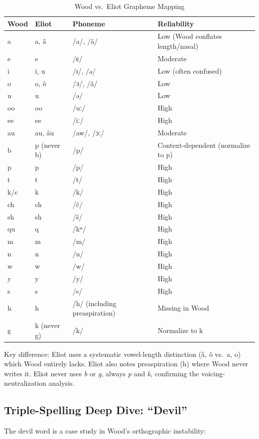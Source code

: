 \begin{table}[htbp]
\centering
\caption{Wood vs.\ Eliot Grapheme Mapping}
\label{tab:1367-vs-eliot}
\begin{tabular}{llll}
\hline
Wood & Eliot & Phoneme & Reliability \\
\hline
a & a, â & /a/, /ã/ & Low (Wood conflates length/nasal) \\
e & e & /ɛ/ & Moderate \\
i & i, u & /ɪ/, /ə/ & Low (often confused) \\
o & o, ô & /ɔ/, /ã/ & Low \\
u & u & /ə/ & Low \\
oo & oo & /uː/ & High \\
ee & ee & /iː/ & High \\
au & au, âu & /aw/, /ɔː/ & Moderate \\
b & p (never b) & /p/ & Context-dependent (normalize to p) \\
p & p & /p/ & High \\
t & t & /t/ & High \\
k/c & k & /k/ & High \\
ch & ch & /č/ & High \\
sh & sh & /š/ & High \\
qu & q & /kʷ/ & High \\
m & m & /m/ & High \\
n & n & /n/ & High \\
w & w & /w/ & High \\
y & y & /y/ & High \\
s & s & /s/ & High \\
h & h & /h/ (including preaspiration) & Missing in Wood \\
g & k (never g) & /k/ & Normalize to k \\
\hline
\end{tabular}
\end{table}

Key difference: Eliot uses a systematic vowel-length distinction (â, ô vs.\ a, o)
which Wood entirely lacks. Eliot also notes preaspiration (h) where Wood never
writes it. Eliot never uses \emph{b} or \emph{g}, always \emph{p} and \emph{k},
confirming the voicing-neutralization analysis.

\subsection{Triple-Spelling Deep Dive: ``Devil''}

The devil word is a case study in Wood's orthographic instability:

